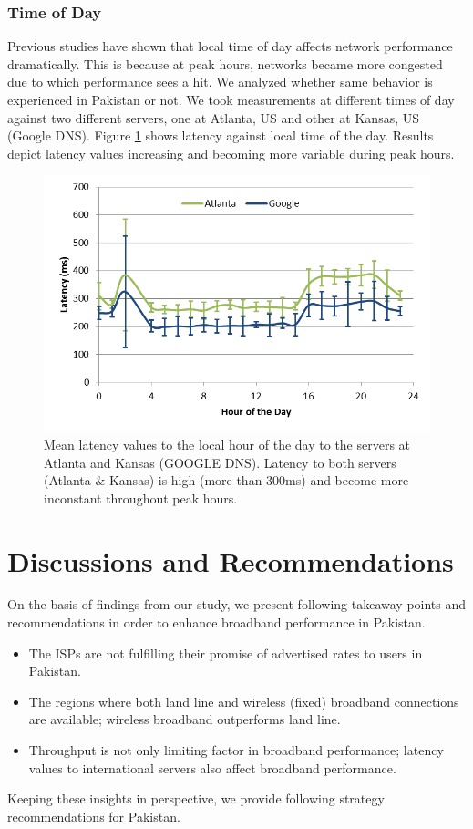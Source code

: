 \documentclass{sig-alternate-10pt}
\begin{document}
\subsubsection{Time of Day}
Previous studies have shown that local time of day affects network performance dramatically. This is because at peak hours, networks became more congested \cite{23} due to which performance sees a hit. We analyzed whether same behavior is experienced in Pakistan or not.
We took measurements at different times of day against two different servers, one at Atlanta, US and other at Kansas, US (Google DNS). Figure \ref{Fig:15} shows latency against local time of the day.  Results depict latency values increasing and becoming more variable during peak hours.

\begin{figure}[h!]
\begin {center}
   \includegraphics[height=0.2 \textheight,width=0.48 \textwidth]{14.png}
   \end {center}
 \caption{Mean latency values to the local hour of the day to the servers at Atlanta and Kansas (GOOGLE DNS). Latency to both servers (Atlanta \& Kansas) is high (more than 300ms) and become more inconstant throughout peak hours.}\label{Fig:15}
\end{figure}

\section {Discussions and Recommendations}
\indent On the basis of findings from our study, we present following takeaway points and recommendations in order to enhance broadband performance in Pakistan.
\begin{itemize}
  \item The ISPs are not fulfilling their promise of advertised rates to users in Pakistan.
  \item The regions where both land line and wireless (fixed) broadband connections are available; wireless broadband outperforms land line.
  \item Throughput is not only limiting factor in broadband performance; latency values to international servers also affect broadband performance.
\end{itemize}
\indent Keeping these insights in perspective, we provide following strategy recommendations for Pakistan.
\end{document}
